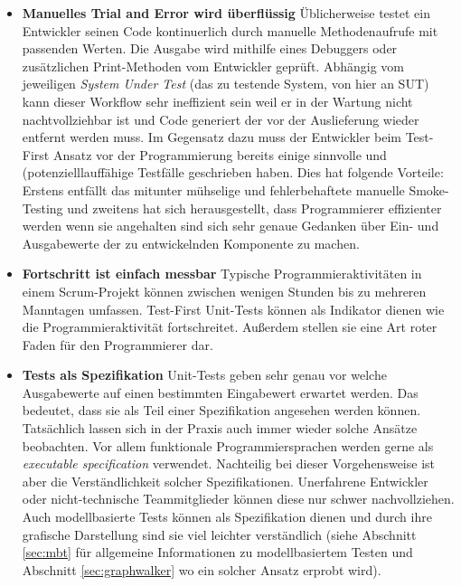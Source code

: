 \begin{itemize}
\item \textbf{Manuelles Trial and Error wird überflüssig} Üblicherweise testet ein Entwickler seinen Code kontinuerlich durch manuelle Methodenaufrufe mit passenden Werten. Die Ausgabe wird mithilfe eines Debuggers oder zusätzlichen Print-Methoden vom Entwickler geprüft. Abhängig vom jeweiligen \textit{System Under Test} (das zu testende System, von hier an \ac{SUT}) kann dieser Workflow sehr ineffizient sein weil er in der Wartung nicht nachtvollziehbar ist und Code generiert der vor der Auslieferung wieder entfernt werden muss. Im Gegensatz dazu muss der Entwickler beim Test-First Ansatz vor der Programmierung bereits einige sinnvolle und (potenzielllauffähige Testfälle geschrieben haben. Dies hat folgende Vorteile: Erstens entfällt das mitunter mühselige und fehlerbehaftete manuelle Smoke-Testing und zweitens hat sich herausgestellt, dass Programmierer effizienter werden wenn sie angehalten sind sich sehr genaue Gedanken über Ein- und Ausgabewerte der zu entwickelnden Komponente zu machen\cite{erdogmus_effectiveness_2005}.
\item \textbf{Fortschritt ist einfach messbar} Typische Programmieraktivitäten in einem Scrum-Projekt können zwischen wenigen Stunden bis zu mehreren Manntagen umfassen. Test-First Unit-Tests können als Indikator dienen wie die Programmieraktivität fortschreitet. Außerdem stellen sie eine Art roter Faden für den Programmierer dar.
\item \textbf{Tests als Spezifikation} Unit-Tests geben sehr genau vor welche Ausgabewerte auf einen bestimmten Eingabewert erwartet werden. Das bedeutet, dass sie als Teil einer Spezifikation angesehen werden können. Tatsächlich lassen sich in der Praxis auch immer wieder solche Ansätze beobachten. Vor allem funktionale Programmiersprachen werden gerne als \textit{executable specification} verwendet\cite{klein_sel4:_2010}. Nachteilig bei dieser Vorgehensweise ist aber die Verständlichkeit solcher Spezifikationen. Unerfahrene Entwickler oder nicht-technische Teammitglieder können diese nur schwer nachvollziehen. Auch modellbasierte Tests können als Spezifikation dienen und durch ihre grafische Darstellung sind sie viel leichter verständlich (siehe Abschnitt \ref{sec:mbt} für allgemeine Informationen zu modellbasiertem Testen und Abschnitt \ref{sec:graphwalker} wo ein solcher Ansatz erprobt wird).
\end{itemize}


